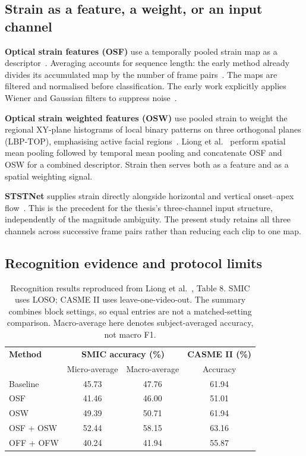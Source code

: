 \subsection{Strain as a feature, a weight, or an input channel}
\label{sec:strain-feature-weight}

\textbf{Optical strain features (OSF)} use a temporally pooled strain map as a descriptor~\cite{liong2014a,liong2014b,liong2016}. Averaging accounts for sequence length: the early method already divides its accumulated map by the number of frame pairs~\cite{liong2014a}. The maps are filtered and normalised before classification. The early work explicitly applies Wiener and Gaussian filters to suppress noise~\cite{liong2014a}.

\textbf{Optical strain weighted features (OSW)} use pooled strain to weight the regional XY-plane histograms of local binary patterns on three orthogonal planes (LBP-TOP), emphasising active facial regions~\cite{liong2014b}. Liong et al.~\cite{liong2016} perform spatial mean pooling followed by temporal mean pooling and concatenate OSF and OSW for a combined descriptor. Strain then serves both as a feature and as a spatial weighting signal.

\textbf{STSTNet} supplies strain directly alongside horizontal and vertical onset--apex flow~\cite{liong2019b}. This is the precedent for the thesis's three-channel input structure, independently of the magnitude ambiguity. The present study retains all three channels across successive frame pairs rather than reducing each clip to one map.

\subsection{Recognition evidence and protocol limits}
\label{sec:strain-evidence}

\begin{table}[htbp]
    \centering
    \small
    \begin{tabular}{@{}lccc@{}}
        \hline
        \textbf{Method} & \multicolumn{2}{c}{\textbf{SMIC accuracy (\%)}} & \textbf{CASME II (\%)} \\
        & Micro-average & Macro-average & Accuracy \\
        \hline
        Baseline & 45.73 & 47.76 & 61.94 \\
        OSF & 41.46 & 46.00 & 51.01 \\
        OSW & 49.39 & 50.71 & 61.94 \\
        OSF + OSW & 52.44 & 58.15 & 63.16 \\
        OFF + OFW & 40.24 & 41.94 & 55.87 \\
        \hline
    \end{tabular}
    \caption[Recognition results for strain-based descriptors]{Recognition results reproduced from Liong et al.~\cite{liong2016}, Table 8. SMIC uses LOSO; CASME II uses leave-one-video-out. The summary combines block settings, so equal entries are not a matched-setting comparison. Macro-average here denotes subject-averaged accuracy, not macro F1.}
    \label{tab:strain-performance}
\end{table}

